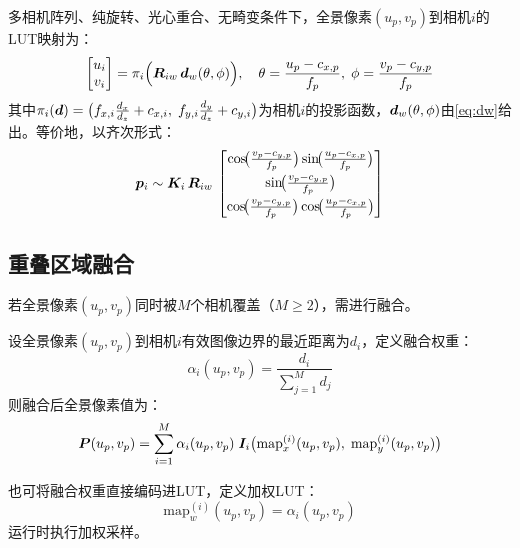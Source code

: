 \begin{finalbox}
多相机阵列、纯旋转、光心重合、无畸变条件下，全景像素$(u_p,v_p)$到相机$i$的LUT映射为：
\[
\begin{bmatrix}
u_i \\ v_i
\end{bmatrix}
=
\pi_i\Bigl(\bm{R}_{iw}\,\bm{d}_w(\theta,\phi)\Bigr),
\quad
\theta = \frac{u_p-c_{x,p}}{f_p},\;
\phi   = \frac{v_p-c_{y,p}}{f_p}
\]
其中$\pi_i(\bm{d}) = \bigl(f_{x,i}\frac{d_x}{d_z}+c_{x,i},\; f_{y,i}\frac{d_y}{d_z}+c_{y,i}\bigr)$为相机$i$的投影函数，$\bm{d}_w(\theta,\phi)$由\eqref{eq:dw}给出。等价地，以齐次形式：
\[
\bm{p}_i \sim \bm{K}_i\,\bm{R}_{iw}\,
\begin{bmatrix}
\cos\!\bigl(\frac{v_p-c_{y,p}}{f_p}\bigr)\sin\!\bigl(\frac{u_p-c_{x,p}}{f_p}\bigr) \\[4pt]
\sin\!\bigl(\frac{v_p-c_{y,p}}{f_p}\bigr) \\[4pt]
\cos\!\bigl(\frac{v_p-c_{y,p}}{f_p}\bigr)\cos\!\bigl(\frac{u_p-c_{x,p}}{f_p}\bigr)
\end{bmatrix}
\]
\end{finalbox}

\subsection{重叠区域融合}
\label{sec:blending}

若全景像素$(u_p, v_p)$同时被$M$个相机覆盖（$M \ge 2$），需进行融合。

\begin{definition}[线性渐入渐出融合]
设全景像素$(u_p, v_p)$到相机$i$有效图像边界的最近距离为$d_i$，定义融合权重：
\begin{equation}
\alpha_i(u_p, v_p) = \frac{d_i}{\sum_{j=1}^{M} d_j}
\label{eq:alpha}
\end{equation}
则融合后全景像素值为：
\begin{equation}
\bm{P}(u_p, v_p) = \sum_{i=1}^{M} \alpha_i(u_p, v_p)\;
\bm{I}_i\bigl(\text{map}_x^{(i)}(u_p,v_p),\; \text{map}_y^{(i)}(u_p,v_p)\bigr)
\label{eq:blending}
\end{equation}
\end{definition}

也可将融合权重直接编码进LUT，定义加权LUT：
\begin{equation}
\text{map}_w^{(i)}(u_p, v_p) = \alpha_i(u_p, v_p)
\label{eq:weight-lut}
\end{equation}
运行时执行加权采样。
